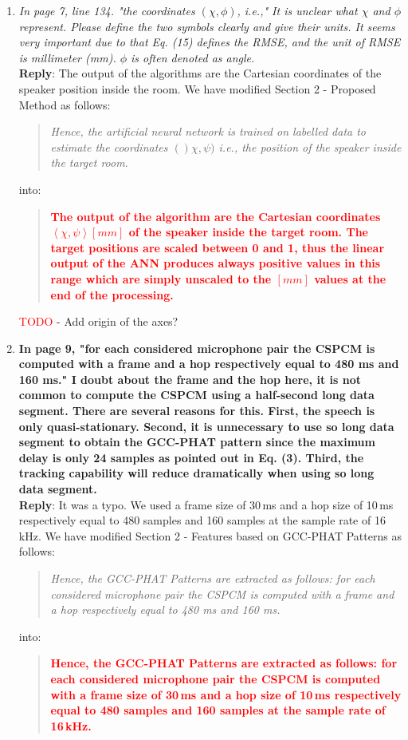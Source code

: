 \documentclass[11pt, technote, letterpaper, oneside, onecolumn]{IEEEtran}
\begin{document}
\begin{enumerate}
\item \textit{In page 7, line 134. "the coordinates $(\chi,\phi)$, i.e.," It is unclear what $\chi$ and $\phi$ represent. Please define the two symbols clearly and give their units. It seems very important due to that Eq. (15) defines the RMSE, and the unit of RMSE is millimeter (mm). $\phi$ is often denoted as angle.\\}
\textbf{Reply}:  The output of the algorithms are the Cartesian coordinates of the speaker position inside the room. We have modified Section 2 - Proposed Method as follows:
\begin{quote}
	\textit{Hence, the artificial neural network is trained on labelled data to estimate the coordinates $()\chi,\psi)$ i.e., the position of the speaker inside the target room.}
\end{quote}
into:
\begin{quote}
	\textcolor{red}{\textbf{The output of the algorithm are the Cartesian coordinates $\left \langle \chi,\psi \right \rangle \left [mm\right ]$ of the speaker inside the target room. The target positions are scaled between 0 and 1, thus the linear output of the ANN produces always positive values in this range which are simply unscaled to the $\left [mm\right ]$ values at the end of the processing.}}
\end{quote}
\textcolor{red}{TODO} - Add origin of the axes?

\item  \textbf{In page 9, "for each considered microphone pair the CSPCM is computed with a frame and a hop respectively equal to 480 ms and 160 ms." I doubt about the frame and the hop here, it is not common to compute the CSPCM using a half-second long data segment. There are several reasons for this. First, the speech is only quasi-stationary. Second, it is unnecessary to use so long data segment to obtain the GCC-PHAT pattern since the maximum delay is only 24 samples as pointed out in Eq. (3). Third, the tracking capability will reduce dramatically when using so long data segment.\\}
\textbf{Reply}:  It was a typo. We used a frame size of 30\,ms and a hop size of 10\,ms respectively equal to 480 samples and 160 samples at the sample rate of 16\,kHz. We have modified Section 2 - Features based on GCC-PHAT Patterns as follows:

\begin{quote}
	\textit{Hence, the GCC-PHAT Patterns are extracted as follows: for each considered microphone pair the CSPCM is computed with a frame and a hop respectively equal to 480 ms and 160 ms.}
\end{quote}
into:
\begin{quote}
	\textcolor{red}{\textbf{Hence, the GCC-PHAT Patterns are extracted as follows: for each considered microphone pair the CSPCM is computed with a frame size of 30\,ms and a hop size of 10\,ms respectively equal to 480 samples and 160 samples at the sample rate of 16\,kHz.}}
\end{quote}



\end{enumerate}
\end{document}
